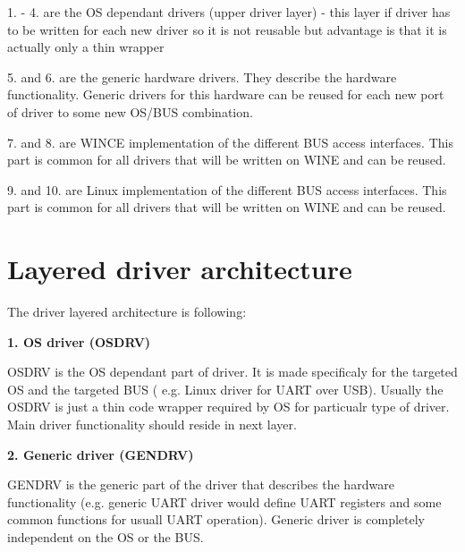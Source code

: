 1. -\/ 4. are the \-O\-S dependant drivers (upper driver layer) -\/ this layer if driver has to be written for each new driver so it is not reusable but advantage is that it is actually only a thin wrapper

5. and 6. are the generic hardware drivers. \-They describe the hardware functionality. \-Generic drivers for this hardware can be reused for each new port of driver to some new \-O\-S/\-B\-U\-S combination.

7. and 8. are \-W\-I\-N\-C\-E implementation of the different \-B\-U\-S access interfaces. \-This part is common for all drivers that will be written on \-W\-I\-N\-E and can be reused.

9. and 10. are \-Linux implementation of the different \-B\-U\-S access interfaces. \-This part is common for all drivers that will be written on \-W\-I\-N\-E and can be reused.\hypertarget{p3_p3s2}{}\section{\-Layered driver architecture}\label{p3_p3s2}
\-The driver layered architecture is following\-:\par
 {\bfseries  1. \-O\-S driver (\-O\-S\-D\-R\-V) }\par
 \-O\-S\-D\-R\-V is the \-O\-S dependant part of driver. \-It is made specificaly for the targeted \-O\-S and the targeted \-B\-U\-S ( e.\-g. \-Linux driver for \-U\-A\-R\-T over \-U\-S\-B). \-Usually the \-O\-S\-D\-R\-V is just a thin code wrapper required by \-O\-S for particualr type of driver. \-Main driver functionality should reside in next layer.

{\bfseries  2. \-Generic driver (\-G\-E\-N\-D\-R\-V) } \par
 \-G\-E\-N\-D\-R\-V is the generic part of the driver that describes the hardware functionality (e.\-g. generic \-U\-A\-R\-T driver would define \-U\-A\-R\-T registers and some common functions for usuall \-U\-A\-R\-T operation). \-Generic driver is completely independent on the \-O\-S or the \-B\-U\-S.


